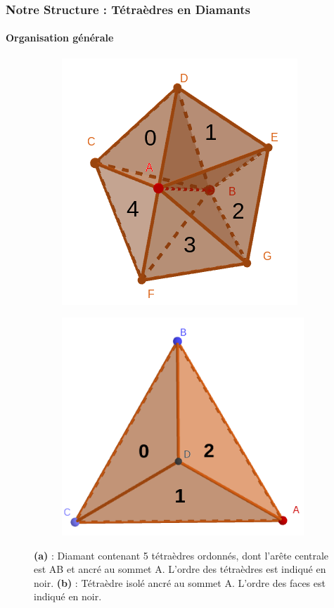 \documentclass[9pt]{beamer}
\begin{document}
\begin{frame}
\small
\frametitle{Notre Structure : Tétraèdres en Diamants}
\framesubtitle{Organisation générale}

\begin{figure}[H]
\centering
\begin{subfigure}{.5\textwidth}
  \centering
  \includegraphics[scale=0.19]{Images/tetra_ordonnee}
  \caption{}
\end{subfigure}%
\begin{subfigure}{.5\textwidth}
  \centering
  \includegraphics[scale=0.16]{Images/tetra_number_face}
  \caption{}
\end{subfigure}
\caption{\textbf{(a)} : Diamant contenant 5 tétraèdres ordonnés, dont l'arête centrale est AB et ancré au sommet A. L'ordre des tétraèdres est indiqué en noir. \textbf{(b)} : Tétraèdre isolé ancré au sommet A. L'ordre des faces est indiqué en noir.}

\end{figure}
\end{frame}
\end{document}
